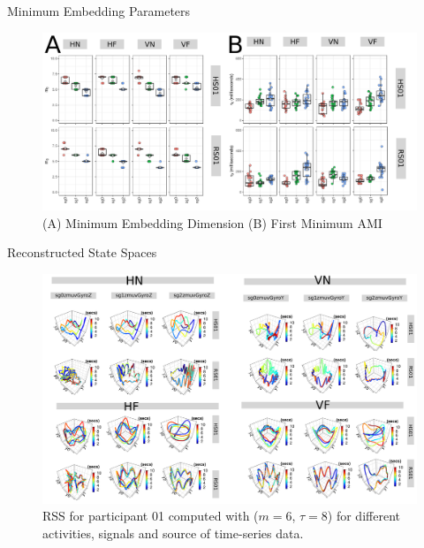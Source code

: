 {
\begin{frame}{Minimum Embedding Parameters}
    \begin{figure}
        \includegraphics[width=0.9\linewidth]{./figs/results/ch6-empa/versions/drawing-v00}{}
	\caption{(A) Minimum Embedding Dimension 
		 (B) First Minimum AMI
		}  
   \end{figure}
	
\end{frame}
}


{
\begin{frame}{Reconstructed State Spaces}
    \begin{figure}
        \includegraphics[width=0.8\linewidth]{./figs/results/ch6-rss/versions/drawing-v00}{}
	\caption{RSS for participant 01 computed with ($m=6$, $\tau=8$)
	for different activities, signals and source of time-series data.
	} 
   \end{figure}
\end{frame}
}






